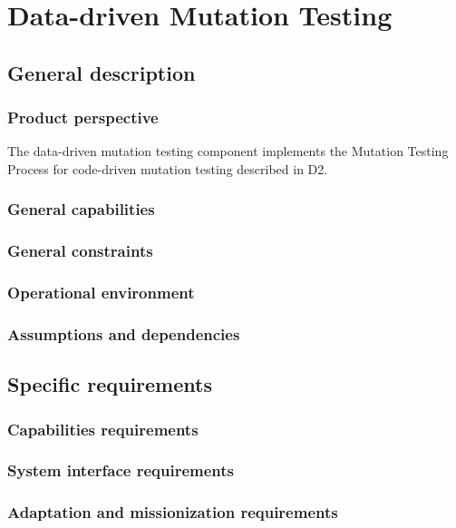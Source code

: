 


\chapter{Data-driven Mutation Testing}

\section{General description}




\subsection{Product perspective}
\RQ The data-driven mutation testing component implements the Mutation Testing Process for code-driven mutation testing described in D2.
\clearpage
\subsection{General capabilities}

\clearpage
\subsection{General constraints}
\subsection{Operational environment}
\subsection{Assumptions and dependencies}
\section{Specific requirements}
\subsection{Capabilities requirements}
\subsection{System interface requirements}
\subsection{Adaptation and missionization requirements }

